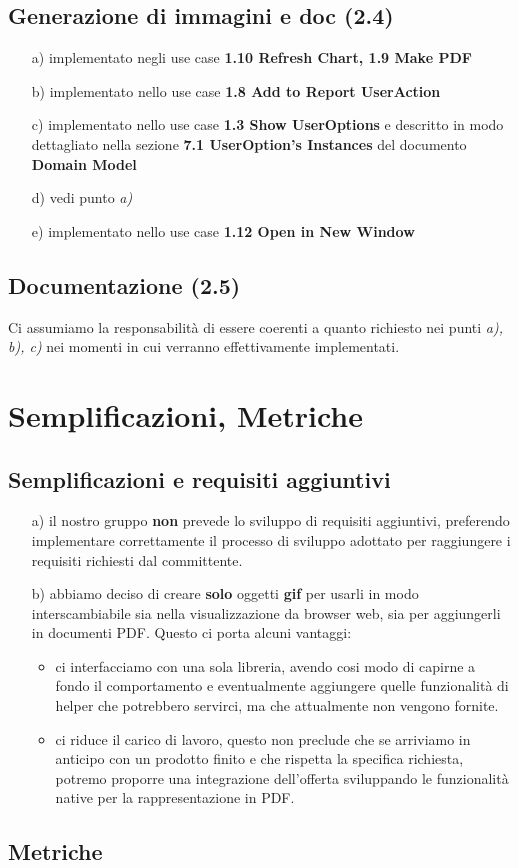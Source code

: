 \section{Generazione di immagini e doc (2.4)}
\begin{itemize}
  \item[a)] implementato negli use case \textbf{1.10 Refresh Chart, 1.9 Make
  PDF}
  \item[b)] implementato nello use case \textbf{1.8 Add to Report UserAction}
  \item[c)] implementato nello use case \textbf{1.3 Show UserOptions} e
  descritto in modo dettagliato nella sezione \textbf{7.1 UserOption’s
  Instances} del documento \textbf{Domain Model}
  \item[d)] vedi punto \emph{a)}
  \item[e)] implementato nello use case \textbf{1.12 Open in New Window}
\end{itemize}

\section{Documentazione (2.5)}
Ci assumiamo la responsabilit\`a di essere coerenti a quanto richiesto nei
punti \emph{a), b), c)} nei momenti in cui verranno effettivamente implementati.

\chapter{Semplificazioni, Metriche}
\section{Semplificazioni e requisiti aggiuntivi}
\begin{itemize}
  \item[a)] il nostro gruppo \textbf{non} prevede lo sviluppo di requisiti
  aggiuntivi, preferendo implementare correttamente il processo di sviluppo adottato per
  raggiungere i requisiti richiesti dal committente.
  \item[b)] abbiamo deciso di creare \textbf{solo} oggetti \textbf{gif} per
  usarli in modo interscambiabile sia nella visualizzazione da browser web, sia
  per aggiungerli in documenti PDF. Questo ci porta alcuni vantaggi:
  \begin{itemize}
    \item ci interfacciamo con una sola libreria, avendo cosi modo di capirne a
    fondo il comportamento e eventualmente aggiungere quelle funzionalit\`a di
    helper che potrebbero servirci, ma che attualmente non vengono fornite.
    \item ci riduce il carico di lavoro, questo non preclude che se arriviamo
    in anticipo con un prodotto finito e che rispetta la specifica richiesta,
    potremo proporre una integrazione dell'offerta sviluppando le
    funzionalit\`a native per la rappresentazione in PDF.
    \end{itemize}
\end{itemize}

\section{Metriche}